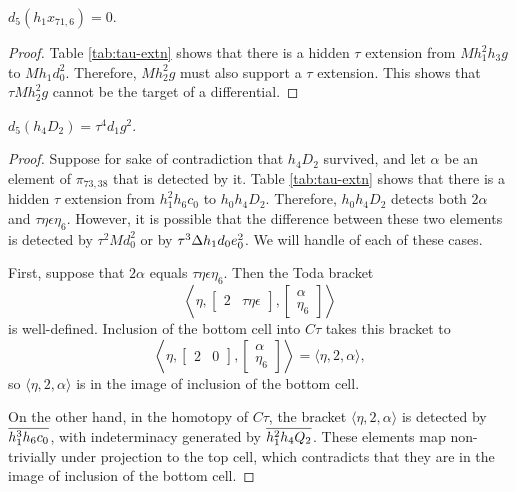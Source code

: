 \begin{lemma}
\label{lem:d5-h1x71,6}
$d_5(h_1 x_{71,6}) = 0$.
\end{lemma}

\begin{proof}
Table \ref{tab:tau-extn} shows that 
there is a hidden $\tau$ extension from 
$M h_1^2 h_3 g$ to $M h_1 d_0^2$.
Therefore, $M h_2^2 g$ must also support a $\tau$ extension.
This shows that $\tau M h_2^2 g$ cannot be the target of a differential.
\end{proof}

\begin{lemma}
\label{lem:d5-h4D2}
$d_5(h_4 D_2) = \tau^4 d_1 g^2$.
\end{lemma}

\begin{proof}
Suppose for sake of contradiction that $h_4 D_2$ survived, and
let $\alpha$ be an element of $\pi_{73,38}$ that is detected by it.
Table \ref{tab:tau-extn} shows that there is a hidden $\tau$ extension
from $h_1^2 h_6 c_0$ to $h_0 h_4 D_2$.  Therefore,
$h_0 h_4 D_2$ detects both $2 \alpha$ and $\tau \eta \epsilon \eta_6$.
However, it is possible that the difference between these two elements
is detected by $\tau^2 M d_0^2$ or by $\tau^3 \Delta h_1 d_0 e_0^2$.
We will handle of each of these cases.

First, suppose that $2 \alpha$ equals $\tau \eta \epsilon \eta_6$.
Then the Toda bracket
\[
\left\langle
\eta,
\left[
\begin{array}{cc}
2 & \tau \eta \epsilon 
\end{array}
\right],
\left[
\begin{array}{c}
\alpha \\ \eta_6 
\end{array}
\right]
\right\rangle
\]
is well-defined.  Inclusion of the bottom cell into $C\tau$ takes this
bracket to
\[
\left\langle
\eta,
\left[
\begin{array}{cc}
2 & 0
\end{array}
\right],
\left[
\begin{array}{c}
\alpha \\ \eta_6 
\end{array}
\right]
\right\rangle =
\langle \eta, 2, \alpha \rangle,
\]
so $\langle \eta, 2, \alpha \rangle$ is in the image of inclusion of 
the bottom cell.

On the other hand,
in the homotopy of $C\tau$, the bracket 
$\langle \eta, 2, \alpha \rangle$ is detected by
$\overline{h_1^3 h_6 c_0}$, with indeterminacy generated by
$\overline{h_1^2 h_4 Q_2}$.  
These elements map non-trivially under projection to the top cell,
which contradicts that they are in the image of inclusion of the 
bottom cell.  


\end{proof}
